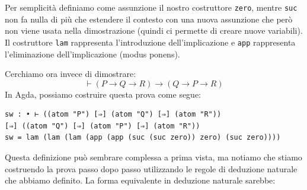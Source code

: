 \documentclass[a4paper]{article}
\theoremstyle{definition}
\theoremstyle{remark}
\begin{document}
\begin{Observation}{}{}{}
Per semplicità definiamo come assunzione il nostro costruttore \texttt{zero},
mentre \texttt{suc} non fa nulla di più che estendere il contesto con una nuova
assunzione che però non viene usata nella dimostrazione (quindi ci permette di creare nuove variabili).
Il costruttore \texttt{lam} rappresenta l'introduzione dell'implicazione e 
\texttt{app} rappresenta l'eliminazione dell'implicazione (modus ponens).
\end{Observation}
\noindent
Cerchiamo ora invece di dimostrare:
\[\vdash (P \to Q \to R) \to (Q \to P \to R)\]
In Agda, possiamo costruire questa prova come segue:
\begin{verbatim}
sw : • ⊢ ((atom "P") [⇒] (atom "Q") [⇒] (atom "R"))
[⇒] ((atom "Q") [⇒] (atom "P") [⇒] (atom "R"))
sw = lam (lam (lam (app (app (suc (suc zero)) zero) (suc zero))))
\end{verbatim}
Questa definizione può sembrare complessa a prima vista, ma notiamo 
che stiamo costruendo la prova passo dopo passo utilizzando le regole di deduzione naturale che abbiamo definito.
La forma equivalente in deduzione naturale sarebbe:
\begin{prooftree}




\end{prooftree}
\end{document}
